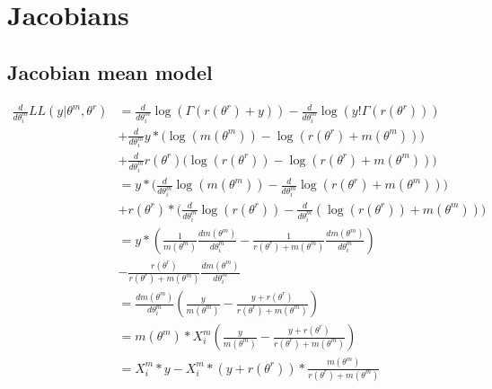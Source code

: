 \documentclass[bibliography=totoc,10pt]{scrartcl}
\begin{document}
\section{Jacobians}
\subsection{Jacobian mean model}
\begin{equation}
\begin{split}
\frac{d}{d \theta^m_i} LL(y|\theta^m, \theta^r) &= \frac{d}{d \theta^m_i} \log(\Gamma(r(\theta^r)+y)) - \frac{d}{d \theta^m_i} \log(y! \Gamma(r(\theta^r))) \\
&+ \frac{d}{d \theta^m_i} y* \bigg( \log(m(\theta^m)) -\log(r(\theta^r)+m(\theta^m)) \bigg) \\
&+ \frac{d}{d \theta^m_i} r(\theta^r) \bigg( \log(r(\theta^r)) -\log(r(\theta^r)+m(\theta^m)) \bigg) \\
&= y* \bigg( \frac{d}{d \theta^m_i} \log(m(\theta^m)) - \frac{d}{d \theta^m_i}\log(r(\theta^r)+m(\theta^m)) \bigg) \\
&+ r(\theta^r) * \bigg( \frac{d}{d \theta^m_i}\log(r(\theta^r)) - \frac{d}{d \theta^m_i} (\log(r(\theta^r))+m(\theta^m)) \bigg) \\
&= y*(\frac{1}{m(\theta^m)}  \frac{d m(\theta^m)}{d \theta^m_i} - \frac{1}{r(\theta^r)+m(\theta^m)}  \frac{d m(\theta^m)}{d \theta^m_i}) \\
&- \frac{r(\theta^r)}{r(\theta^r)+m(\theta^m)}  \frac{d m(\theta^m)}{d \theta^m_i} \\
&=  \frac{d m(\theta^m)}{d \theta^m_i} (\frac{y}{m(\theta^m)} - \frac{y+r(\theta^r)}{r(\theta^r)+m(\theta^m)}) \\
&=  m(\theta^m) * X^m_{i}  (\frac{y}{m(\theta^m)} - \frac{y+r(\theta^r)}{r(\theta^r)+m(\theta^m)}) \\
&=  X^m_{i}*y - X^m_{i}*(y+r(\theta^r))*\frac{m(\theta^m)}{r(\theta^r)+m(\theta^m)} \\
\end{split}
\end{equation}
\end{document}
